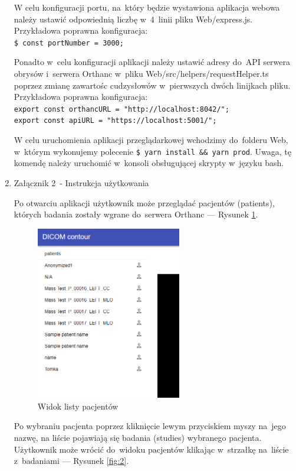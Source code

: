 \documentclass[a4paper,11pt,twoside,openright]{report}
\theoremstyle{definition}
\begin{document}
\begin{enumerate}
W celu konfiguracji portu, na~który będzie wystawiona aplikacja webowa należy
ustawić odpowiednią liczbę w~4~linii pliku Web/express.js. Przykładowa poprawna
konfiguracja:\\
\texttt{\$ const portNumber = 3000;}

Ponadto w~celu konfiguracji aplikacji należy ustawić adresy do~API serwera obrysów
i~serwera Orthanc w~pliku Web/src/helpers/requestHelper.ts poprzez zmianę zawartośc
cudzysłowów w~pierwszych dwóch linijkach pliku. 	Przykładowa poprawna konfiguracja:\\
\texttt{export const orthancURL = "http://localhost:8042/";}\\
\texttt{export const apiURL = "https://localhost:5001/";}

W celu uruchomienia aplikacji przeglądarkowej wchodzimy do~folderu Web, w~którym
wykonujemy polecenie \texttt{\$ yarn install \&\& yarn prod}. Uwaga, tę komendę
należy uruchomić w~konsoli obsługującej skrypty w~języku bash.




\newpage
\item Załącznik 2~- Instrukcja użytkowania

Po otwarciu aplikacji użytkownik może przeglądać pacjentów (patients), których
badania zostały wgrane do~serwera Orthanc --- Rysunek \ref{fig:1}.

\begin{figure}[h!]
	\center
	\includegraphics[width=0.6\textwidth]{1}
	\caption{Widok listy pacjentów}
    	\label{fig:1}
\end{figure}

Po wybraniu pacjenta poprzez kliknięcie lewym przyciskiem myszy na~jego nazwę,
na liście pojawiają się badania (studies) wybranego pacjenta. Użytkownik może
wrócić do~widoku pacjentów klikając w~strzałkę na~liście z~badaniami --- Rysunek \ref{fig:2}.


\end{enumerate}
\end{document}
